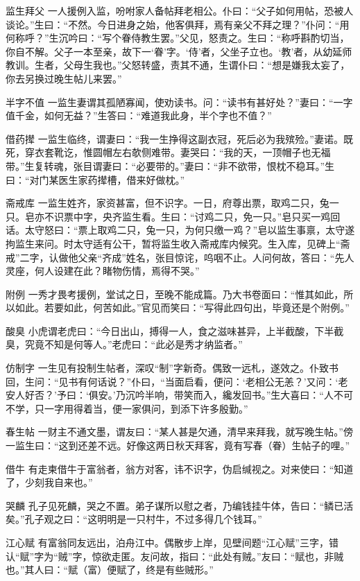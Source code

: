 \documentclass[12pt,UTF8]{ctexbook}
\begin{document}
监生拜父
一人援例入监，吩咐家人备帖拜老相公。仆曰：“父子如何用帖，恐被人谈论。”生曰：“不然。今日进身之始，他客俱拜，焉有亲父不拜之理？”仆问：“用何称呼？”生沉吟曰：“写个眷侍教生罢。”父见，怒责之。生曰：“称呼斟酌切当，你自不解。父子一本至亲，故下一‘眷’字。‘侍’者，父坐子立也。‘教’者，从幼延师教训。生者，父母生我也。”父怒转盛，责其不通，生谓仆曰：“想是嫌我太妄了，你去另换过晚生帖儿来罢。”

半字不值
一监生妻谓其孤陋寡闻，使劝读书。问：“读书有甚好处？”妻曰：“一字值千金，如何无益？”生答曰：“难道我此身，半个字也不值？”

借药撵
一监生临终，谓妻曰：“我一生挣得这副衣冠，死后必为我殡殓。”妻诺。既死，穿衣套靴讫，惟圆帽左右欹侧难带。妻哭曰：“我的天，一顶帽子也无福带。”生复转魂，张目谓妻曰：“必要带的。”妻曰：“非不欲带，恨枕不稳耳。”生曰：“对门某医生家药撵槽，借来好做枕。”

斋戒库
一监生姓齐，家资甚富，但不识字。一日，府尊出票，取鸡二只，兔一只。皂亦不识票中字，央齐监生看。生曰：“讨鸡二只，免一只。”皂只买一鸡回话。太守怒曰：“票上取鸡二只，兔一只，为何只缴一鸡？”皂以监生事禀，太守遂拘监生来问。时太守适有公干，暂将监生收入斋戒库内候究。生入库，见碑上“斋戒”二字，认做他父亲“齐成”姓名，张目惊诧，呜咽不止。人问何故，答曰：“先人灵座，何人设建在此？睹物伤情，焉得不哭。”

附例
一秀才畏考援例，堂试之日，至晚不能成篇。乃大书卷面曰：“惟其如此，所以如此。若要如此，何苦如此。”官见而笑曰：“写得此四句出，毕竟还是个附例。”

酸臭
小虎谓老虎曰：“今日出山，搏得一人，食之滋味甚异，上半截酸，下半截臭，究竟不知是何等人。”老虎曰：“此必是秀才纳监者。”

仿制字
一生见有投制生帖者，深叹“制”字新奇。偶致一远札，遂效之。仆致书回，生问：“见书有何话说？”仆曰，“当面启看，便问：‘老相公无恙？’又问：‘老安人好否？’予曰：‘俱安。’乃沉吟半响，带笑而入，纔发回书。”生大喜曰：“人不可不学，只一字用得着当，便一家俱问，到添下许多殷勤。”

春生帖
一财主不通文墨，谓友曰：“某人甚是欠通，清早来拜我，就写晚生帖。”傍一监生曰：“这到还差不远。好像这两日秋天拜客，竟有写春（眷）生帖子的哩。”

借牛
有走柬借牛于富翁者，翁方对客，讳不识字，伪启缄视之。对来使曰：“知道了，少刻我自来也。”

哭麟
孔子见死麟，哭之不置。弟子谋所以慰之者，乃编钱挂牛体，告曰：“鳞已活矣。”孔子观之曰：“这明明是一只村牛，不过多得几个钱耳。”

江心赋
有富翁同友远出，泊舟江中。偶散步上岸，见壁间题“江心赋”三字，错认“赋”字为“贼”字，惊欲走匿。友问故，指曰：“此处有贼。”友曰：“赋也，非贼也。”其人曰：“赋（富）便赋了，终是有些贼形。”
\end{document}
